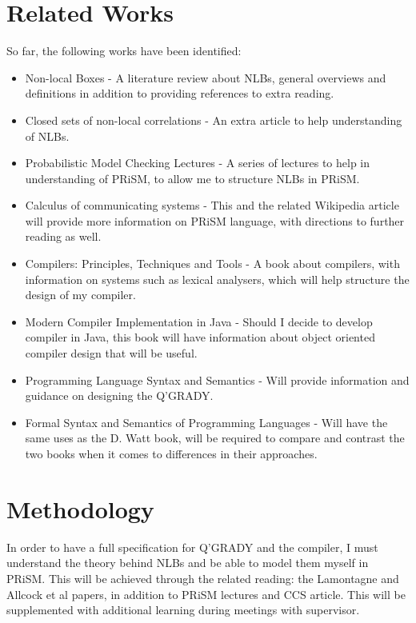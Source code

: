 \documentclass[11pt, a4paper]{article}
\begin{document}

\section{Related Works} %
\label{sec:related_works}
So far, the following works have been identified:
\begin{itemize}
    \item Non-local Boxes \parencite{nlb_lamontagne} - A literature review about
    NLBs, general overviews and definitions in addition to providing references
    to extra reading.
    \item Closed sets of non-local correlations
    \parencite{Jonathan-Allcock:2009pd} - An extra article to help understanding
    of NLBs.
    \item Probabilistic Model Checking Lectures \parencite{prism_lectures} - A
    series of lectures to help in understanding of PRiSM, to allow me to
    structure NLBs in PRiSM.
    \item Calculus of communicating systems \parencite{ccs} - This and the
    related Wikipedia article will provide more information on PRiSM language,
    with directions to further reading as well. 
    \item Compilers: Principles, Techniques and Tools
    \parencite{dragon_compiler} - A book about compilers, with information on
    systems such as lexical analysers, which will help structure the design of
    my compiler.
    \item Modern Compiler Implementation in Java \parencite{java_compiler} -
    Should I decide to develop compiler in Java, this book will have information
    about object oriented compiler design that will be useful.
    \item Programming Language Syntax and Semantics
    \parencite{Watt:1991:PLS:120468} - Will provide information and guidance on
    designing the Q'GRADY.
    \item Formal Syntax and Semantics of Programming Languages \parencite{fsspl}
    - Will have the same uses as the D. Watt book, will be required to compare
    and contrast the two books when it comes to differences in their approaches.
\end{itemize}


\section{Methodology} %
\label{sec:methodology}
In order to have a full specification for Q'GRADY and the compiler, I must 
understand the theory behind NLBs and be able to model them myself in PRiSM.
This will be achieved through the related reading: the Lamontagne and Allcock et
al papers, in addition to PRiSM lectures and CCS article. This will be
supplemented with additional learning during meetings with supervisor.
\end{document}
